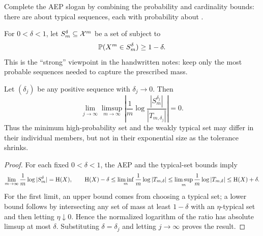 \begin{yourturn}
Complete the AEP slogan by combining the probability and cardinality bounds:
there are about  typical sequences, each with
probability about .
\end{yourturn}


\begin{definition}\label{def:minimum-high-probability-set}
For $0<\delta<1$, let $S_m^\delta\subseteq\mathcal{X}^m$ be a set of
 subject to
\[
  \mathbb{P}(X^m\in S_m^\delta)\ge1-\delta.
\]
This is the ``strong'' viewpoint in the handwritten notes: keep only the most
probable sequences needed to capture the prescribed mass.
\end{definition}

\begin{proposition}\label{prop:typical-set-equivalence}
Let $(\delta_j)$ be any positive sequence with $\delta_j\to0$. Then
\[
  \lim_{j\to\infty}\limsup_{m\to\infty}
  \left|\frac1m\log
  \frac{|S_m^{\delta_j}|}{|T_{m,\delta_j}|}\right|=0.
\]
Thus the minimum high-probability set and the weakly typical set may differ in
their individual members, but not in their exponential size as the tolerance
shrinks.
\end{proposition}

\begin{proof}
For each fixed $0<\delta<1$, the AEP and the typical-set bounds imply
\[
  \lim_{m\to\infty}\frac1m\log|S_m^\delta|=\mathrm{H}(X),
  \qquad
  \mathrm{H}(X)-\delta
  \le\liminf_m\frac1m\log|T_{m,\delta}|
  \le\limsup_m\frac1m\log|T_{m,\delta}|
  \le\mathrm{H}(X)+\delta.
\]
For the first limit, an upper bound comes from choosing a typical set; a lower
bound follows by intersecting any set of mass at least $1-\delta$ with an
$\eta$-typical set and then letting $\eta\downarrow0$. Hence the normalized
logarithm of the ratio has absolute limsup at most $\delta$. Substituting
$\delta=\delta_j$ and letting $j\to\infty$ proves the result.
\end{proof}

